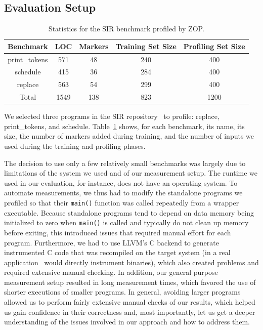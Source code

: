 \subsection{Evaluation Setup}
\label{sec:evaluation-setup}
\begin{table}[htb]
  \begin{center}
    \caption{Statistics for the SIR benchmark profiled by ZOP.}
    \begin{tabular}{|c|c|c|c|c|}
      \hline
      Benchmark & LOC & Markers
      & Training Set Size
      & Profiling Set Size \\
      \hline
      \hline
      print\_tokens & 571 & 48 & 240 & 400 \\
      \hline
      schedule      & 415 & 36 & 284 & 400 \\
      \hline
      replace       & 563 & 54 & 299 & 400 \\
      \hline
      Total        & 1549 &138 & 823 & 1200 \\
      \hline
    \end{tabular}
    \label{table:benchmarks}
  \end{center}
\end{table}

We selected three programs in the SIR repository~\cite{Software-artifact} to profile: replace, print\_tokens, and schedule. Table~\ref{table:benchmarks} shows, for each benchmark, its name, its size, the number of markers added during training, and the number of inputs we used during the training and profiling phases.

The decision to use only a few relatively small benchmarks was largely due to limitations of the system we used and of our measurement setup.  The runtime we used in our evaluation, for instance, does not have an operating system. To automate measurements, we thus had to modify the standalone programs we profiled so that their \texttt{main()} function was called repeatedly from a wrapper executable. Because standalone programs tend to depend on data memory being initialized to zero when \texttt{main()} is called and typically do not clean up memory before exiting, this introduced issues that required manual effort for each program. Furthermore, we had to use LLVM's C backend to generate instrumented C code that was recompiled on the target system (in a real application \zop\ would directly instrument binaries), which also created problems and required extensive manual checking. In addition, our general purpose measurement setup resulted in long measurement times, which favored the use of shorter executions of smaller programs. In general, avoiding larger programs allowed us to perform fairly extensive manual checks of our results, which helped us gain confidence in their correctness and, most importantly, let us get a deeper understanding of the issues involved in our approach and how to address them. 

